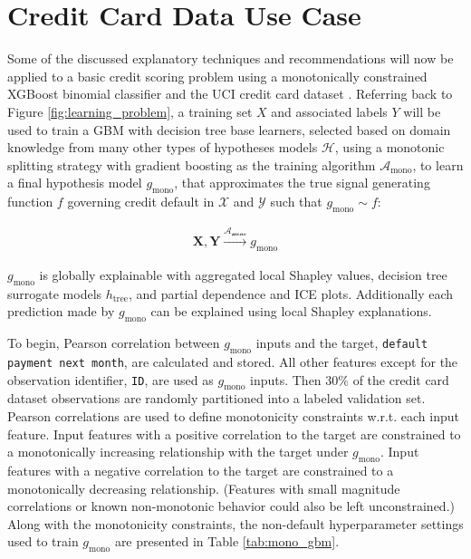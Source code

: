 \documentclass[11pt]{asaproc}
\begin{document}
\section{Credit Card Data Use Case} \label{sec:use_case}

Some of the discussed explanatory techniques and recommendations will now be applied to a basic credit scoring problem using a monotonically constrained XGBoost binomial classifier and the UCI credit card dataset \cite{uci}. Referring back to Figure \ref{fig:learning_problem}, a training set $X$ and associated labels $Y$ will be used to train a GBM with decision tree base learners, selected based on domain knowledge from many other types of hypotheses models $\mathcal{H}$, using a monotonic splitting strategy with gradient boosting as the training algorithm $\mathcal{A}_{\text{mono}}$, to learn a final hypothesis model $g_{\text{mono}}$, that approximates the true signal generating function $f$ governing credit default in $\mathcal{X}$ and $\mathcal{Y}$ such that $g_{\text{mono}} \sim f$:

\begin{equation}
\label{eq:cc_training}
\begin{aligned}
\mathbf{X}, \mathbf{Y} \xrightarrow{\mathcal{A_{\text{mono}}}} g_{\text{mono}}
\end{aligned}
\end{equation}

\noindent$g_{\text{mono}}$ is globally explainable with aggregated local Shapley values, decision tree surrogate models $h_{\text{tree}}$, and partial dependence and ICE plots. Additionally each prediction made by $g_{\text{mono}}$ can be explained using local Shapley explanations. 

To begin, Pearson correlation between $g_{\text{mono}}$ inputs and the target, \texttt{default payment next month}, are calculated and stored. All other features except for the observation identifier, \texttt{ID}, are used as $g_{\text{mono}}$ inputs. Then 30\% of the credit card dataset observations are randomly partitioned into a labeled validation set. Pearson correlations are used to define monotonicity constraints w.r.t. each input feature. Input features with a positive correlation to the target are constrained to a monotonically increasing relationship with the target under $g_{\text{mono}}$. Input features with a negative correlation to the target are constrained to a monotonically decreasing relationship. (Features with small magnitude correlations or known non-monotonic behavior could also be left unconstrained.) Along with the monotonicity constraints, the non-default hyperparameter settings used to train $g_{\text{mono}}$ are presented in Table \ref{tab:mono_gbm}. 
\end{document}
